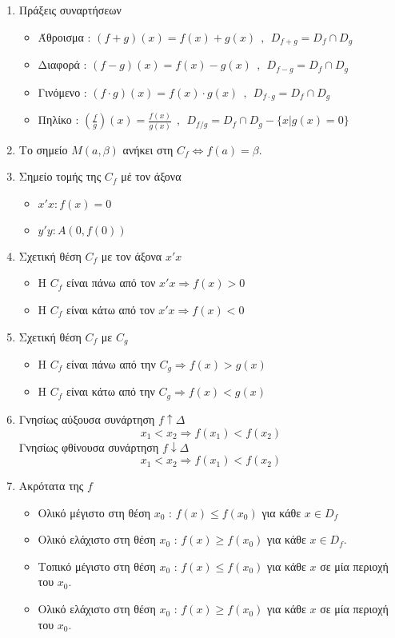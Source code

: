 \documentclass[a4paper,11pt]{article}
\begin{document}
\begin{enumerate}[resume]
\item Πράξεις συναρτήσεων
\begin{itemize}
\item Άθροισμα : $(f+g)(x)=f(x)+g(x)\ \ ,\ \ D_{f+g}=D_f\cap D_g$
\item Διαφορά : $(f-g)(x)=f(x)-g(x)\ \ ,\ \ D_{f-g}=D_f\cap D_g$
\item Γινόμενο : $(f\cdot g)(x)=f(x)\cdot g(x)\ \ ,\ \ D_{f\cdot g}=D_f\cap D_g$
\item Πηλίκο : $\left(\frac{f}{g}\right)(x)=\frac{f(x)}{g(x)}\ \ ,\ \ D_{f/g}=D_f\cap D_g-\{x|g(x)=0\}$
\end{itemize}
\item Το σημείο $ M(a,\beta) $ ανήκει στη $C_f\Leftrightarrow f(a)=\beta$.
\item Σημείο τομής της $C_f$ μέ τον άξονα
\begin{multicols}{2}
\begin{itemize}
\item $x'x : f(x)=0$
\item $y'y : A(0,f(0))$
\end{itemize}
\end{multicols}
\item Σχετική θέση $C_f$ με τον άξονα $x'x$
\begin{itemize}
\item Η $C_f$ είναι πάνω από τον $x'x\Rightarrow f(x)>0$
\item Η $C_f$ είναι κάτω από τον $x'x\Rightarrow f(x)<0$
\end{itemize}
\item Σχετική θέση $C_f$ με $C_g$
\begin{itemize}
\item Η $C_f$ είναι πάνω από την $C_g\Rightarrow f(x)>g(x)$
\item Η $C_f$ είναι κάτω από την $C_g\Rightarrow f(x)<g(x)$
\end{itemize}
\item Γνησίως αύξουσα συνάρτηση $f\uparrow\varDelta $
\[x_1<x_2\Rightarrow f(x_1)<f(x_2)\] 
Γνησίως φθίνουσα συνάρτηση $f\downarrow\varDelta$
\[x_1<x_2\Rightarrow f(x_1)<f(x_2)\] 
\item Ακρότατα της $f$
\begin{itemize}
\item Ολικό μέγιστο στη θέση $x_0$ : $f(x)\leq f(x_0)$ για κάθε $x\in D_f $
\item Ολικό ελάχιστο στη θέση $ x_0 $ : $f(x)\geq f(x_0)$ για κάθε $x\in D_f$.
\item Τοπικό μέγιστο στη θέση $x_0$ : $f(x)\leq f(x_0)$ για κάθε $x$ σε μία περιοχή του $x_0$.
\item Ολικό ελάχιστο στη θέση $ x_0 $ : $f(x)\geq f(x_0)$ για κάθε $x$ σε μία περιοχή του $x_0$.
\end{itemize}
\end{enumerate}
\end{document}

